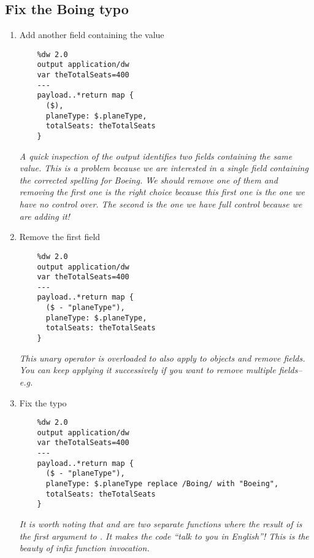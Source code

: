 \subsection{Fix the Boing typo}
\begin{enumerate}[resume*]
\item Add another field containing the  value
  \begin{lstlisting}
    %dw 2.0
    output application/dw
    var theTotalSeats=400
    ---
    payload..*return map {
      ($),
      planeType: $.planeType,
      totalSeats: theTotalSeats
    }
  \end{lstlisting}
  \emph {
    A quick inspection of the output identifies two  fields containing the same value.  This is a problem because we are interested in a single field containing the corrected spelling for Boeing.  We should remove one of them and removing the first one is the right choice because this first one is the one we have no control over.  The second  is the one we have full control because we are adding it!
  }
\item Remove the first  field
  \begin{lstlisting}
    %dw 2.0
    output application/dw
    var theTotalSeats=400
    ---
    payload..*return map {
      ($ - "planeType"),
      planeType: $.planeType,
      totalSeats: theTotalSeats
    }
  \end{lstlisting}
  \emph{
    This unary \ttt{-} operator is overloaded to also apply to objects and remove fields.  You can keep applying it successively if you want to remove multiple fields--e.g.  
  }
\item Fix the  typo
  \begin{lstlisting}
    %dw 2.0
    output application/dw
    var theTotalSeats=400
    ---
    payload..*return map {
      ($ - "planeType"),
      planeType: $.planeType replace /Boing/ with "Boeing",
      totalSeats: theTotalSeats
    }
  \end{lstlisting}
  \emph{
    It is worth noting that  and  are two separate functions where the result of  is the first argument to .  It makes the code ``talk to you in English''!  This is the beauty of infix function invocation. 
  }
\end{enumerate}


